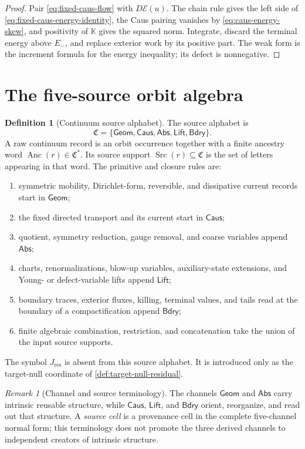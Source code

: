 \documentclass[11pt]{article}
\numberwithin{section}{part}
\theoremstyle{plain}
\theoremstyle{definition}
\newtheorem{definition}[definition]{Definition}
\theoremstyle{remark}
\newtheorem{remark}[remark]{Remark}
\newcommand{\Geom}{\mathsf{Geom}}
\newcommand{\Caus}{\mathsf{Caus}}
\newcommand{\Abs}{\mathsf{Abs}}
\newcommand{\Lift}{\mathsf{Lift}}
\newcommand{\Bdry}{\mathsf{Bdry}}
\newcommand{\Res}{J_{\mathrm{res}}}
\newcommand{\Channels}{\mathfrak C}
\newcommand{\Anc}{\operatorname{Anc}}
\newcommand{\Src}{\operatorname{Src}}
\newcommand{\Energy}{\mathcal E}
\begin{document}
\begin{proof}
Pair \eqref{eq:fixed-caus-flow} with \(D\Energy(u)\).  The chain rule gives
the left side of \eqref{eq:fixed-caus-energy-identity}, the Caus pairing
vanishes by \eqref{eq:caus-energy-skew}, and positivity of \(\mathbb K\)
gives the squared norm.  Integrate, discard the terminal energy above
\(E_-\), and replace exterior work by its positive part.  The weak form is
the increment formula for the energy inequality; its defect is nonnegative.
\end{proof}

\section{The five-source orbit algebra}
\label{sec:source-algebra}

\begin{definition}[Continuum source alphabet]
\label{def:source-alphabet}
The source alphabet is
\[
 \Channels=\{\Geom,\Caus,\Abs,\Lift,\Bdry\}.
\]
A raw continuum record is an orbit occurrence together with a finite ancestry
word \(\Anc(r)\in\Channels^*\).  Its source support
\(\Src(r)\subseteq\Channels\) is the set of letters appearing in that word.
The primitive and closure rules are:
\begin{enumerate}[label=\textup{(S\arabic*)}]
\item symmetric mobility, Dirichlet-form, reversible, and dissipative current
records start in \(\Geom\);
\item the fixed directed transport and its current start in \(\Caus\);
\item quotient, symmetry reduction, gauge removal, and coarse variables append
\(\Abs\);
\item charts, renormalizations, blow-up variables, auxiliary-state extensions,
and Young- or defect-variable lifts append \(\Lift\);
\item boundary traces, exterior fluxes, killing, terminal values, and tails
read at the boundary of a compactification append \(\Bdry\);
\item finite algebraic combination, restriction, and concatenation take the
union of the input source supports.
\end{enumerate}
The symbol \(\Res\) is absent from this source alphabet.  It is introduced
only as the target-null coordinate of \cref{def:target-null-residual}.
\end{definition}

\begin{remark}[Channel and source terminology]
The channels \(\Geom\) and \(\Abs\) carry intrinsic reusable structure,
while \(\Caus\), \(\Lift\), and \(\Bdry\) orient, reorganize, and read out
that structure.  A \emph{source cell} is a provenance cell in the complete
five-channel normal form; this terminology does not promote the three derived
channels to independent creators of intrinsic structure.
\end{remark}
\end{document}
